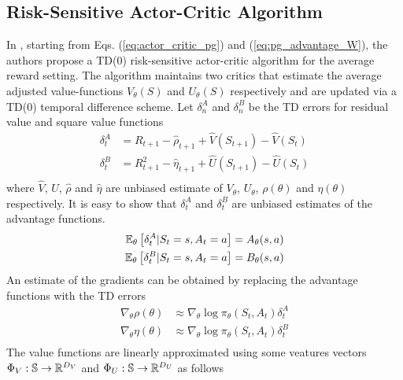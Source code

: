 \subsection{Risk-Sensitive Actor-Critic Algorithm}
In \cite{prashanth2014actor}, starting from Eqs. (\ref{eq:actor_critic_pg}) and 
(\ref{eq:pg_advantage_W}), the authors propose a TD(0) risk-sensitive actor-critic 
algorithm for the average reward setting. The algorithm maintains two critics that estimate the average adjusted value-functions $V_\theta(S)$ and $U_\theta(S)$ respectively and are updated via a TD(0) temporal difference scheme. Let $\delta_n^A$ and $\delta_n^B$ be the TD errors for residual value
and square value functions
\begin{equation}
	\begin{split}
		\delta_t^A &= R_{t+1} - \widehat{\rho}_{t+1} + \widehat{V}(S_{t+1}) -
		\widehat{V}(S_t)\\
		\delta_t^B &= R_{t+1}^2 - \widehat{\eta}_{t+1} + \widehat{U}(S_{t+1}) -
		\widehat{U}(S_t)\\
	\end{split}
\end{equation}
where $\widehat{V}$, $\widehat{U}$, $\widehat{\rho}$ and $\widehat{\eta}$ are
unbiased estimate of $V_\theta$, $U_\theta$, $\rho(\theta)$ and $\eta(\theta)$
respectively. It is easy to show that $\delta_t^A$ and $\delta_t^B$ are
unbiased estimates of the advantage functions.
\begin{equation*}
	\begin{split}
		\E[\theta]{\delta_t^A|S_t = s, A_t = a} &= A_\theta(s, a)\\
		\E[\theta]{\delta_t^B|S_t = s, A_t = a} &= B_\theta(s, a)\\
	\end{split}
\end{equation*}
An estimate of the gradients can be obtained by replacing the advantage functions with the TD errors
\begin{equation}
	\begin{split}
		\nabla_\theta \rho(\theta) &\approx \nabla_\theta \log \pi_\theta(S_t, A_t) \delta_t^A\\
		\nabla_\theta \eta(\theta) &\approx \nabla_\theta \log \pi_\theta(S_t, A_t) \delta_t^B\\
	\end{split}
\end{equation}
The value functions are linearly approximated using some veatures vectors
$\Phi_V: \S \to \R^{D_V}$ and $\Phi_U: \S \to \R^{D_U}$ as follows
